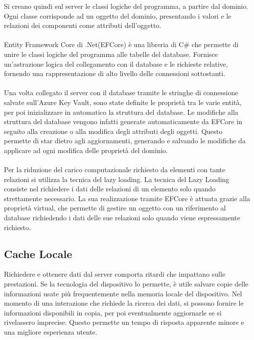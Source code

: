 Si creano quindi sul server le classi logiche del programma, a partire dal dominio. 
Ogni classe corrisponde ad un oggetto del dominio, presentando i valori e le relazioni dei componenti come attributi dell’oggetto.\\
\\
Entity Framework Core di .Net(EFCore) è una libreria di C\# che permette di unire le classi logiche del programma alle tabelle del database. 
Fornisce un’astrazione logica del collegamento con il database e le richieste relative, fornendo una rappresentazione di alto livello delle connessioni sottostanti. \\
\\
Una volta collegato il server con il database tramite le stringhe di connessione salvate sull’Azure Key Vault, 
sono state definite le proprietà tra le varie entità, per poi inizializzare in automatico la struttura del database. 
Le modifiche alla struttura del database vengono infatti generate automaticamente da EFCore in seguito alla creazione o alla modifica degli attributi degli oggetti. 
Questo permette di star dietro agli aggiornamenti, generando e salvando le modifiche da applicare ad ogni modifica delle proprietà del dominio.\\
\\
Per la riduzione del carico computazionale richiesto da elementi con tante relazioni si utilizza la tecnica del lazy loading. 
La tecnica del Lazy Loading consiste nel richiedere i dati delle relazioni di un elemento solo quando strettamente necessario. 
La sua realizzazione tramite EFCore è attuata grazie alla proprietà virtual, 
che permette di gestire un oggetto con un riferimento al database richiedendo i dati delle sue relazioni solo quando viene espressamente richiesto.
\clearpage
\subsection{ Cache Locale}

Richiedere e ottenere dati dal server comporta ritardi che impattano sulle prestazioni. 
Se la tecnologia del dispositivo lo permette, è utile salvare copie delle informazioni usate più frequentemente nella memoria locale del dispositivo. 
Nel momento di una interazione che richiede la ricerca dei dati, si possono fornire le informazioni disponibili in copia, 
per poi eventualmente aggiornarle se si rivelassero imprecise. Questo permette un tempo di risposta apparente minore e una migliore esperienza utente.\\
\\

